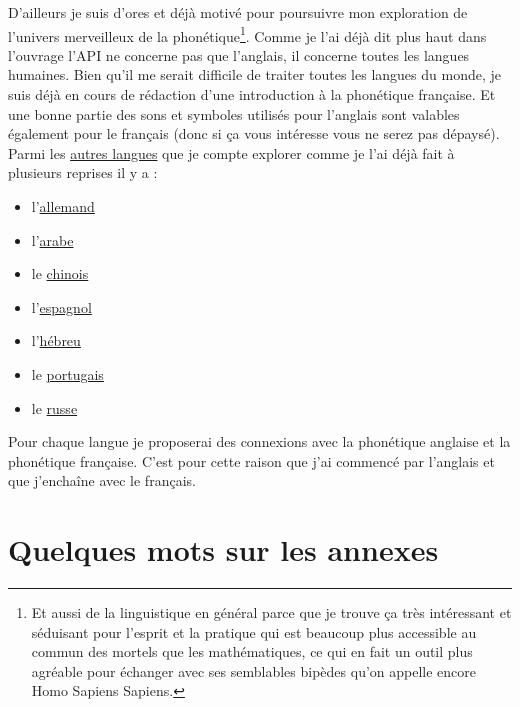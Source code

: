 D'ailleurs je suis d'ores et déjà motivé pour poursuivre mon
exploration de l'univers merveilleux de la phonétique\footnote{Et
  aussi de la linguistique en général parce que je trouve ça très
  intéressant et séduisant pour l'esprit et la pratique qui est
  beaucoup plus accessible au commun des mortels que les
  mathématiques, ce qui en fait un outil plus agréable pour échanger
  avec ses semblables bipèdes qu'on appelle encore Homo Sapiens
  Sapiens.}. Comme je l'ai déjà dit plus haut dans l'ouvrage l'API ne
concerne pas que l'anglais, il concerne toutes les langues
humaines. Bien qu'il me serait difficile de traiter toutes les langues
du monde, je suis déjà en cours de rédaction d'une introduction à la
phonétique française. Et une bonne partie des sons et symboles
utilisés pour l'anglais sont valables également pour le
français (donc si ça vous intéresse vous ne serez pas dépaysé). Parmi les \href{https://www.youtube.com/playlist?list=PLfKvL-VUSKAnkBk88BAb3oq1MlGVnhwcY}{autres
  langues} que je compte explorer comme je l'ai déjà fait à plusieurs
reprises il y a :
\begin{itemize}
  \item  l'\href{https://www.youtube.com/playlist?list=PLfKvL-VUSKAnM9MWJT9F1z1QZTdb73i7r}{allemand}
  \item
    l'\href{https://www.youtube.com/playlist?list=PLfKvL-VUSKAkXu2x3Fp74QxxYUVP43haA}{arabe}
  \item le
    \href{https://www.youtube.com/playlist?list=PLfKvL-VUSKAl4R0Mh7sKvQjqCsiEEa6D9}{chinois}
  \item
    l'\href{https://www.youtube.com/playlist?list=PLfKvL-VUSKAm_p6ikI_pTbxNuHco73REt}{espagnol}
  \item
    l'\href{https://www.youtube.com/playlist?list=PLfKvL-VUSKAkbDhpbtXc7RdroMBBeTJx0}{hébreu}
  \item le
    \href{https://www.youtube.com/playlist?list=PLfKvL-VUSKAn0zUUPYsMDd8_1J_UtfRxh}{portugais}
  \item le \href{https://www.youtube.com/playlist?list=PLfKvL-VUSKAk0YrJ3rV6cBj-w6rNCeOJB}{russe}
  \end{itemize}

Pour chaque langue je proposerai des connexions avec la phonétique
anglaise et la phonétique française. C'est pour cette raison que j'ai
commencé par l'anglais et que j'enchaîne avec le français.

\chapter{Quelques mots sur les annexes}\label{chap:mots-annex}

